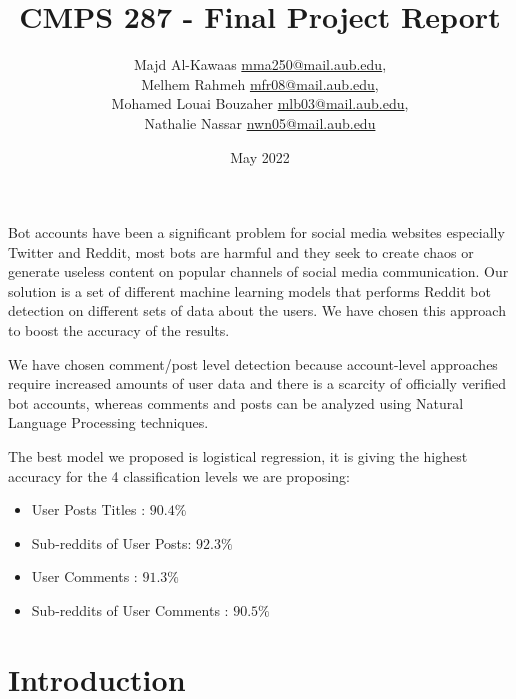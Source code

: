 \documentclass{article}
\title{CMPS 287 - Final Project Report}
\author{Majd Al-Kawaas  \hspace*{5mm} \url{mma250@mail.aub.edu},\\  Melhem Rahmeh \hspace*{5mm} \url{mfr08@mail.aub.edu}, \\ Mohamed Louai Bouzaher \hspace*{5mm} \url{mlb03@mail.aub.edu},\\ Nathalie Nassar \hspace*{5mm} \url{nwn05@mail.aub.edu}

}
\date{May 2022}
\begin{document}
\maketitle

Bot accounts have been a significant problem for social media websites especially Twitter and Reddit, most bots are harmful and they seek to create chaos or generate useless content on popular channels of social media communication. Our solution is a set of different machine learning models that performs Reddit bot detection on different sets of data about the users. We have chosen this approach to boost the accuracy of the results. \par

We have chosen comment/post level detection because account-level approaches require increased amounts of user data and there is a scarcity of officially verified bot accounts, whereas comments and posts can be analyzed using Natural Language Processing techniques.\par

The best model we proposed is logistical regression, it is giving the highest accuracy for the 4 classification levels we are proposing: \\
\begin{itemize}
\item User Posts Titles : $90.4\%$
\item Sub-reddits of User Posts: $92.3\%$
\item User Comments : $91.3\%$
\item Sub-reddits of User Comments : $90.5\%$


\end{itemize}

\section{Introduction}
\end{document}
